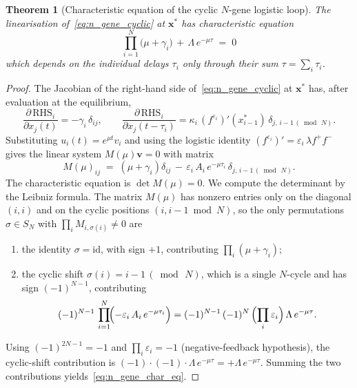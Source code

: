 \documentclass[sn-mathphys,Numbered]{sn-jnl}
\theoremstyle{thmstyleone}
\newtheorem{theorem}{Theorem}
\theoremstyle{thmstyletwo}
\theoremstyle{thmstylethree}
\begin{document}
\begin{theorem}[Characteristic equation of the cyclic $N$-gene logistic loop]
\label{thm:n_gene_char_eq}
The linearisation of~\eqref{eq:n_gene_cyclic} at $\mathbf{x}^*$ has
characteristic equation
\begin{equation}
\boxed{\;
\prod_{i=1}^N \bigl(\mu+\gamma_i\bigr)
\,+\, \Lambda\, e^{-\mu\tau}
\;=\; 0\;}
\label{eq:n_gene_char_eq}
\end{equation}
which depends on the individual delays $\tau_i$ only through their sum
$\tau=\sum_i\tau_i$.
\end{theorem}
\begin{proof}
The Jacobian of the right-hand side of~\eqref{eq:n_gene_cyclic} at
$\mathbf{x}^*$ has, after evaluation at the equilibrium,
\[
\frac{\partial\,\mathrm{RHS}_i}{\partial x_j(t)}
   = -\gamma_i\,\delta_{ij},
\qquad
\frac{\partial\,\mathrm{RHS}_i}{\partial x_j(t-\tau_i)}
   = \kappa_i\,(f^{\varepsilon_i})'(x_{i-1}^*)\,
       \delta_{j,\,i-1\,(\bmod\,N)}.
\]
Substituting $u_i(t)=e^{\mu t}v_i$ and using the logistic identity
$(f^{\varepsilon_i})'=\varepsilon_i\,\lambda f^+ f^-$ gives the
linear system $M(\mu)\mathbf{v}=0$ with matrix
\[
M(\mu)_{ij} \;=\; (\mu+\gamma_i)\delta_{ij}
                  \,-\, \varepsilon_i\,A_i\,
                         e^{-\mu\tau_i}\,\delta_{j,\,i-1\,(\bmod\,N)}.
\]
The characteristic equation is $\det M(\mu)=0$. We compute the
determinant by the Leibniz formula. The matrix $M(\mu)$ has nonzero
entries only on the diagonal $(i,i)$ and on the cyclic positions
$(i,i-1\bmod N)$, so the only permutations $\sigma\in S_N$ with
$\prod_i M_{i,\sigma(i)}\neq 0$ are
\begin{enumerate}
\item the identity $\sigma=\mathrm{id}$, with sign $+1$, contributing
      $\prod_i (\mu+\gamma_i)$;
\item the cyclic shift $\sigma(i)=i-1\,(\bmod\,N)$, which is a single
      $N$-cycle and has sign $(-1)^{N-1}$, contributing
      \[
        (-1)^{N-1}\,\prod_{i=1}^N\!\Bigl(-\varepsilon_i\,A_i\,e^{-\mu\tau_i}\Bigr)
        = (-1)^{N-1}\,(-1)^N\,\Bigl(\prod_i\varepsilon_i\Bigr)\,
                            \Lambda\,e^{-\mu\tau}.
      \]
\end{enumerate}
Using $(-1)^{2N-1}=-1$ and $\prod_i\varepsilon_i=-1$ (negative-feedback
hypothesis), the cyclic-shift contribution is
$(-1)\cdot(-1)\cdot\Lambda\,e^{-\mu\tau}=+\Lambda\,e^{-\mu\tau}$.
Summing the two contributions
yields~\eqref{eq:n_gene_char_eq}.
\end{proof}
\end{document}
